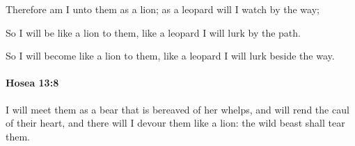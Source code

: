 			\begin{versebox}
					\item[BHS] 
					\item[LXX] 
					\item[ASV] Therefore am I unto them as a lion; as a leopard will I watch by the way;
					\item[NIV] So I will be like a lion to them, like a leopard I will lurk by the path.
					\item[NRSV] So I will become like a lion to them, like a leopard I will lurk beside the way.
			\end{versebox}

		\paragraph{Hosea 13:8} %
			\label{HOSEA-13-8}

			I will meet them as a bear that is bereaved of her whelps, and will rend the caul of their heart, and there will I devour them like a lion: the wild beast shall tear them.

